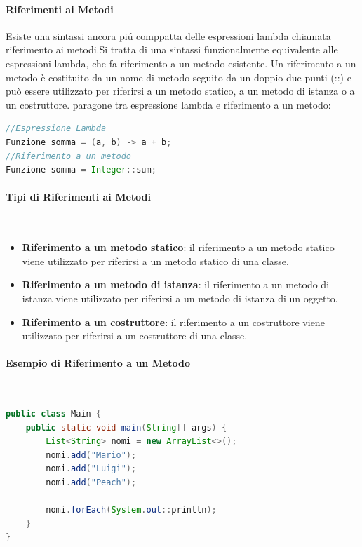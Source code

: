 \documentclass[11pt]{article}
\begin{document}
\paragraph{Riferimenti ai Metodi}
Esiste una sintassi ancora piú comppatta delle espressioni lambda chiamata riferimento ai metodi.Si tratta di una sintassi funzionalmente equivalente alle espressioni lambda, che fa riferimento a un metodo esistente.
Un riferimento a un metodo è costituito da un nome di metodo seguito da un doppio due punti (::) e può essere utilizzato per riferirsi a un metodo statico, a un metodo di istanza o a un costruttore.
paragone tra espressione lambda e riferimento a un metodo:
\begin{lstlisting}[language=Java]
//Espressione Lambda
Funzione somma = (a, b) -> a + b;
//Riferimento a un metodo
Funzione somma = Integer::sum;
\end{lstlisting}

\paragraph{Tipi di Riferimenti ai Metodi}\\
\begin{itemize}
    \item \textbf{Riferimento a un metodo statico}: il riferimento a un metodo statico viene utilizzato per riferirsi a un metodo statico di una classe.
    \item \textbf{Riferimento a un metodo di istanza}: il riferimento a un metodo di istanza viene utilizzato per riferirsi a un metodo di istanza di un oggetto.
    \item \textbf{Riferimento a un costruttore}: il riferimento a un costruttore viene utilizzato per riferirsi a un costruttore di una classe.
    \end{itemize}
\paragraph{Esempio di Riferimento a un Metodo}
\\
\begin{lstlisting}[language=Java]
public class Main {
    public static void main(String[] args) {
        List<String> nomi = new ArrayList<>();
        nomi.add("Mario");
        nomi.add("Luigi");
        nomi.add("Peach");

        nomi.forEach(System.out::println);
    }
}
\end{lstlisting}
\end{document}
